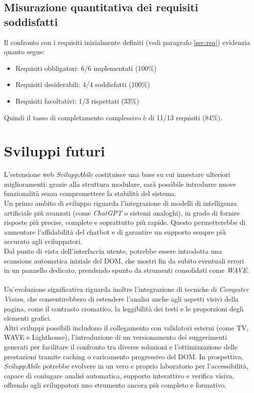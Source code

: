 \subsection{Misurazione quantitativa dei requisiti soddisfatti}
\noindent Il confronto con i requisiti inizialmente definiti (vedi paragrafo \ref{sec:req}) evidenzia quanto segue:
\begin{itemize}
    \item Requisiti obbligatori: 6/6 implementati (100\%)
    \item Requisiti desiderabili: 4/4 soddisfatti (100\%)
    \item Requisiti facoltativi: 1/3 rispettati (33\%)
\end{itemize}
Quindi il tasso di completamento complessivo è di 11/13 requisiti (84\%).

\section{Sviluppi futuri}
\noindent L’estensione web \textit{SviluppAbile} costituisce una base su cui innestare ulteriori miglioramenti: grazie alla struttura modulare, sarà possibile introdurre nuove funzionalità senza compromettere la stabilità del sistema.\\
Un primo ambito di sviluppo riguarda l’integrazione di modelli di intelligenza artificiale più avanzati (come \textit{ChatGPT} o sistemi analoghi), in grado di fornire risposte più precise, complete e soprattutto più rapide. Questo permetterebbe di aumentare l’affidabilità del chatbot e di garantire un supporto sempre più accurato agli sviluppatori.\\
Dal punto di vista dell’interfaccia utente, potrebbe essere introdotta una scansione automatica iniziale del DOM, che mostri fin da subito eventuali errori in un pannello dedicato, prendendo spunto da strumenti consolidati come \textit{WAVE}.\\
\\
Un’evoluzione significativa riguarda inoltre l’integrazione di tecniche di \textit{Computer Vision}, che consentirebbero di estendere l’analisi anche agli aspetti visivi della pagina, come il contrasto cromatico, la leggibilità dei testi e le proporzioni degli elementi grafici.\\
Altri sviluppi possibili includono il collegamento con validatori esterni (come TV, WAVE e Lighthouse), l’introduzione di un versionamento dei suggerimenti generati per facilitare il confronto tra diverse soluzioni e l’ottimizzazione delle prestazioni tramite caching o caricamento progressivo del DOM.
In prospettiva, \textit{SviluppAbile} potrebbe evolvere in un vero e proprio laboratorio per l’accessibilità, capace di coniugare analisi automatica, supporto interattivo e verifica visiva, offrendo agli sviluppatori uno strumento ancora più completo e formativo.

